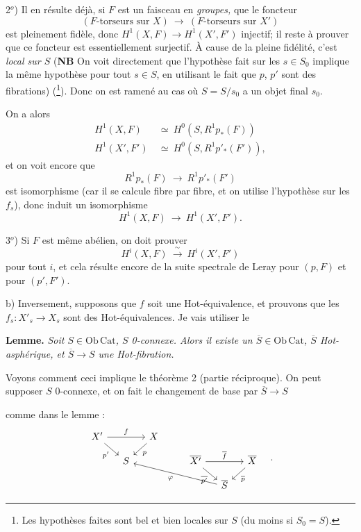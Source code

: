 \documentclass[11pt]{article}
\newcommand{\printedpage}[1]{\marginpar{\footnotesize p.~#1}}
\newcommand{\msp}[1]{\marginpar{\footnotesize [#1]}}
\newcommand{\Ob}{\mathrm{Ob}\,}
\newcommand{\Cat}{\mathrm{Cat}}
\begin{document}
2$^{o}$) Il en résulte déjà, si $F$ est un faisceau en \textit{groupes,} que le foncteur
\[
(F\text{-torseurs sur } X) \ \longrightarrow\ (F\text{-torseurs sur } X')
\]
est pleinement fidèle, donc $H^1(X,F) \longrightarrow H^1(X',F')$ injectif; il reste à prouver que ce foncteur est essentiellement surjectif. À cause de la pleine fidélité, c'est \textit{local sur $S$} (\textbf{NB} On voit directement que l'hypothèse fait sur les $s \in S_0$ implique la même hypothèse pour tout $s \in S$, en utilisant le fait que $p$, $p'$ sont des fibrations) (\footnote{Les hypothèses faites sont bel et bien locales sur $S$ (du moins si $S_0 = S$).}). Donc on est ramené au cas où $S = S/s_0$ a un objet final $s_0$.

\printedpage{5}

\msp{page 133}

On a alors
\[
\begin{aligned}
H^1(X,F) &\ \simeq\ H^0(S, R^1p_*(F)) \\
H^1(X',F') &\ \simeq\ H^0(S, R^1p'_*(F')),
\end{aligned}
\]
et on voit encore que
\[
R^1p_*(F) \ \longrightarrow\ R^1p'_*(F')
\]
est isomorphisme (car il se calcule fibre par fibre, et on utilise l'hypothèse sur les $f_s$), donc induit un isomorphisme
\[
H^1(X,F) \ \longrightarrow\ H^1(X',F').
\]

3$^{o}$) Si $F$ est même abélien, on doit prouver
\[
H^i(X,F) \ \xrightarrow{\ \sim\ }\ H^i(X',F')
\]
pour tout $i$, et cela résulte encore de la suite spectrale de Leray pour $(p,F)$ et pour $(p',F')$.

b) Inversement, supposons que $f$ soit une Hot-équivalence, et prouvons que les $f_s : X'_s \longrightarrow X_s$ sont des Hot-équivalences. Je vais utiliser le

\textbf{Lemme.} \textit{Soit $S \in \Ob\Cat$, $S$ \textup{0}-connexe. Alors il existe un $\overline{S} \in \Ob\Cat$, $\overline{S}$ \textup{Hot}-asphérique, et $\overline{S} \longrightarrow S$ une \textup{Hot}-fibration.}

Voyons comment ceci implique le théorème 2 (partie réciproque). On peut supposer $S$ 0-connexe, et on fait le changement de base par $\overline{S} \longrightarrow S$

\msp{page 134}

comme dans le lemme :
\[
\begin{tikzcd}[column sep=small, row sep=small]
X' \arrow[rr, "f"] \arrow[dr, "p'"'] & & X \arrow[dl, "p"] & & & & \\
& S & & & \overline{X'} \arrow[rr, "\overline{f}"] \arrow[dr, "\overline{p'}"'] & & \overline{X} \arrow[dl, "\overline{p}"] \\
& & & & & \overline{S} \arrow[ullll, "\varphi"] &
\end{tikzcd}
\quad .
\]
\end{document}
